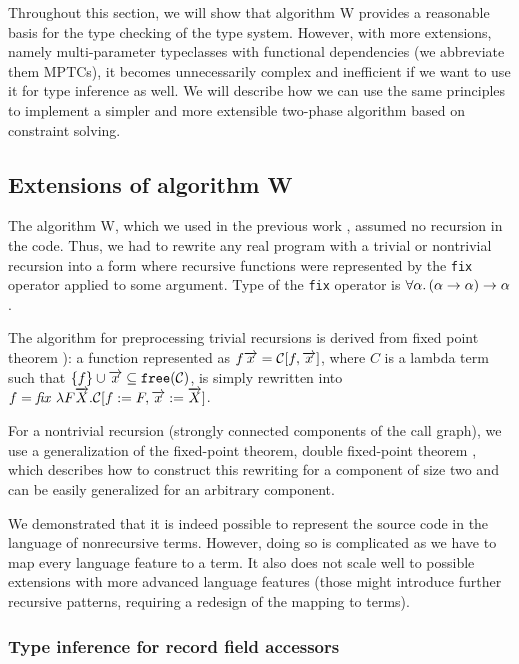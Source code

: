 Throughout this section, we will show that algorithm W provides a reasonable basis for the type checking of the type system. However, with more extensions, namely multi-parameter typeclasses with functional dependencies \cite{jones2000type} (we abbreviate them MPTCs), it becomes unnecessarily complex and inefficient if we want to use it for type inference as well. We will describe how we can use the same principles to implement a simpler and more extensible two-phase algorithm based on constraint solving.

\subsection{Extensions of algorithm W}

The algorithm W, which we used in the previous work \cite{klepl2020type}, assumed no recursion in the code. Thus, we had to rewrite any real program with a trivial or nontrivial recursion into a form where recursive functions were represented by the \lstinline{fix} operator applied to some argument. Type of the \lstinline{fix} operator is $\forall \alpha . \left(\alpha \to \alpha\right) \to \alpha$.

The algorithm for preprocessing trivial recursions is derived from fixed point theorem \cite{barendregt1992lambda,damas1982principal}): a function represented as $f \overrightarrow{x} = \mathcal{C}[f, \overrightarrow{x}]$, where $C$ is a lambda term such that $\{f\} \cup \overrightarrow{x} \subseteq \mathtt{free} (\mathcal{C})$, is simply rewritten into $f = \mathit{fix}\ \lambda F \overrightarrow{X} .\mathcal{C}[f := F, \overrightarrow{x} := \overrightarrow{X}]$.

For a nontrivial recursion (strongly connected components of the call graph), we use a generalization of the fixed-point theorem, double fixed-point theorem \cite{stepanek}, which describes how to construct this rewriting for a component of size two and can be easily generalized for an arbitrary component.

We demonstrated that it is indeed possible to represent the source code in the language of nonrecursive terms. However, doing so is complicated as we have to map every language feature to a term. It also does not scale well to possible extensions with more advanced language features (those might introduce further recursive patterns, requiring a redesign of the mapping to terms).

\subsubsection{Type inference for record field accessors}
\label{ex_structs}

